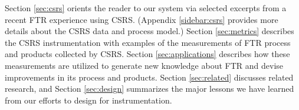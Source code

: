 Section \ref{sec:csrs} orients the reader to our system via selected
excerpts from a recent FTR experience using CSRS.  (Appendix
\ref{sidebar:csrs} provides more details about the CSRS data and process
model.)  Section \ref{sec:metrics} describes the CSRS instrumentation
with examples of the measurements of FTR process and products collected by
CSRS.  Section \ref{sec:applications} describes how these measurements are
utilized to generate new knowledge about FTR and devise improvements in its
process and products. Section \ref{sec:related} discusses related research,
and Section \ref{sec:design} summarizes the major
lessons we have learned from our efforts to design for instrumentation.


